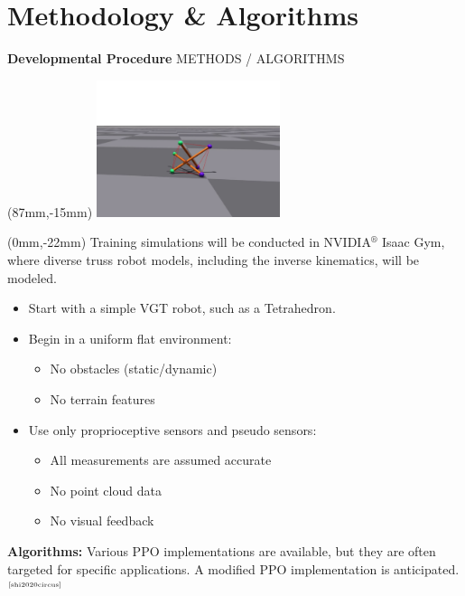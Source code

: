 \documentclass[11pt,aspectratio=169]{beamer}
\begin{document}
\section{Methodology \& Algorithms}

\begin{frame}[fragile]{\textbf{Developmental Procedure} \hfill \fontsize{8}{8}\selectfont METHODS / ALGORITHMS}
    
        \begin{textblock*}{5cm}(87mm,-15mm) %
        \includegraphics[trim={11cm 3cm 10cm 10cm},clip,height=40mm]{elements/[14]-Tensegrity.png}
        \end{textblock*}


        \begin{textblock*}{138mm}(0mm,-22mm)
         Training simulations will be conducted in NVIDIA$^{\text{®}}$ Isaac Gym, where diverse truss robot models, including the inverse kinematics, will be modeled.
        
        \begin{itemize}
            \item Start with a simple VGT robot, such as a Tetrahedron.
            \item Begin in a uniform flat environment:
            \begin{itemize}
                \item No obstacles (static/dynamic)
                \item No terrain features
            \end{itemize}
            \item Use only proprioceptive sensors and pseudo sensors:
            \begin{itemize}
                \item All measurements are assumed accurate
                \item No point cloud data
                \item No visual feedback
            \end{itemize}
        \end{itemize}

        \bigskip

        \textbf{Algorithms:} Various PPO implementations are available, but they are often targeted for specific applications. A modified PPO implementation is anticipated.$^{\text{\tiny \cite{shi2020circus}}}$

        \end{textblock*}

\end{frame}
\end{document}
